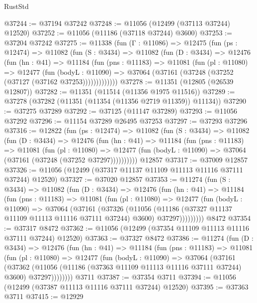 \begin{lexlean}{RustStd}
\begin{coremodule}
@37244 := @37194 @37242
@37248 := @11056 (@12499 (@37113 @37244) @12520)
@37252 := @11056 (@11186 (@37118 @37244) @3600)
@37253 := @37204 @37242
@37275 := @11338
    (fun (Γ : @11086) =>
    @12475
      (fun (ps : @12474) =>
      @11082
        (fun (S : @3434) =>
        @11082
          (fun (D : @3434) =>
          @12476
            (fun (hn : @41) =>
            @11184
              (fun (pns : @11183) =>
              @11081
                (fun (pl : @11080) =>
                @12477
                  (fun (bodyL : @11090) =>
                  @37064 (@37161 (@37248 (@37252 (@37127 (@37162 @37253)))))))))))))
@37278 := @11351 (@12805 (@26539 @12807))
@37282 := @11351 (@11514 (@11356 @1975 @11516))
@37289 := @37278 (@37282 (@11351 (@11354 (@11356 @2719 @11359)) @11134))
@37290 := @37275 @37289
@37292 := @37125 (@11147 @37289)
@37293 := @11056 @37292
@37296 := @11154 @37289 @26495 @37253
@37297 := @37293 @37296
@37316 := @12822
    (fun (ps : @12474) =>
    @11082
      (fun (S : @3434) =>
      @11082
        (fun (D : @3434) =>
        @12476
          (fun (hn : @41) =>
          @11184
            (fun (pns : @11183) =>
            @11081
              (fun (pl : @11080) =>
              @12477 (fun (bodyL : @11090) => @37064 (@37161 (@37248 (@37252 @37297))))))))))
    @12857
@37317 := @37009 @12857
@37326 := @11056 (@12499 (@37317 @11137 @11109 @11113 @11116 @37111 @37244) @12520)
@37327 := @37020 @12857
@37353 := @11274
    (fun (S : @3434) =>
    @11082
      (fun (D : @3434) =>
      @12476
        (fun (hn : @41) =>
        @11184
          (fun (pns : @11183) =>
          @11081
            (fun (pl : @11080) =>
            @12477
              (fun (bodyL : @11090) =>
              @37064
                (@37161
                  (@37326
                    (@11056
                      (@11186 (@37327 @11137 @11109 @11113 @11116 @37111 @37244) @3600)
                      @37297)))))))))
    @8472
@37354 := @37317 @8472
@37362 := @11056 (@12499 (@37354 @11109 @11113 @11116 @37111 @37244) @12520)
@37363 := @37327 @8472
@37386 := @11274
    (fun (D : @3434) =>
    @12476
      (fun (hn : @41) =>
      @11184
        (fun (pns : @11183) =>
        @11081
          (fun (pl : @11080) =>
          @12477
            (fun (bodyL : @11090) =>
            @37064
              (@37161
                (@37362
                  (@11056 (@11186 (@37363 @11109 @11113 @11116 @37111 @37244) @3600) @37297))))))))
    @3711
@37387 := @37354 @3711
@37394 := @11056 (@12499 (@37387 @11113 @11116 @37111 @37244) @12520)
@37395 := @37363 @3711
@37415 := @12929

\end{coremodule}
\end{lexlean}
